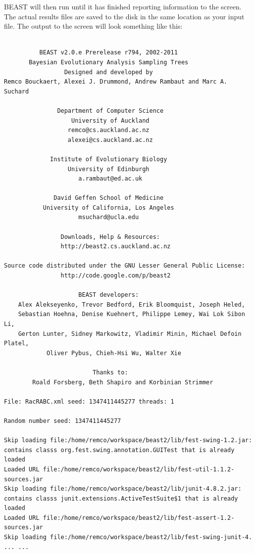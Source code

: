 \documentclass{article}
\begin{document}
BEAST will then run until it has finished
reporting information to the screen. The actual results files are
saved to the disk in the same location as your input file. The output to the screen will
look something like this: 

{\scriptsize   
\begin{verbatim}

          BEAST v2.0.e Prerelease r794, 2002-2011
       Bayesian Evolutionary Analysis Sampling Trees
                 Designed and developed by
Remco Bouckaert, Alexei J. Drummond, Andrew Rambaut and Marc A. Suchard
                              
               Department of Computer Science
                   University of Auckland
                  remco@cs.auckland.ac.nz
                  alexei@cs.auckland.ac.nz
                              
             Institute of Evolutionary Biology
                  University of Edinburgh
                     a.rambaut@ed.ac.uk
                              
              David Geffen School of Medicine
           University of California, Los Angeles
                     msuchard@ucla.edu
                              
                Downloads, Help & Resources:
              	http://beast2.cs.auckland.ac.nz
                              
Source code distributed under the GNU Lesser General Public License:
              	http://code.google.com/p/beast2
                              
                     BEAST developers:
	Alex Alekseyenko, Trevor Bedford, Erik Bloomquist, Joseph Heled, 
	Sebastian Hoehna, Denise Kuehnert, Philippe Lemey, Wai Lok Sibon Li, 
	Gerton Lunter, Sidney Markowitz, Vladimir Minin, Michael Defoin Platel, 
          	Oliver Pybus, Chieh-Hsi Wu, Walter Xie
                              
                         Thanks to:
    	Roald Forsberg, Beth Shapiro and Korbinian Strimmer

File: RacRABC.xml seed: 1347411445277 threads: 1

Random number seed: 1347411445277

Skip loading file:/home/remco/workspace/beast2/lib/fest-swing-1.2.jar: contains classs org.fest.swing.annotation.GUITest that is already loaded
Loaded URL file:/home/remco/workspace/beast2/lib/fest-util-1.1.2-sources.jar
Skip loading file:/home/remco/workspace/beast2/lib/junit-4.8.2.jar: contains classs junit.extensions.ActiveTestSuite$1 that is already loaded
Loaded URL file:/home/remco/workspace/beast2/lib/fest-assert-1.2-sources.jar
Skip loading file:/home/remco/workspace/beast2/lib/fest-swing-junit-4.
... ...

\end{verbatim}}
\end{document}
